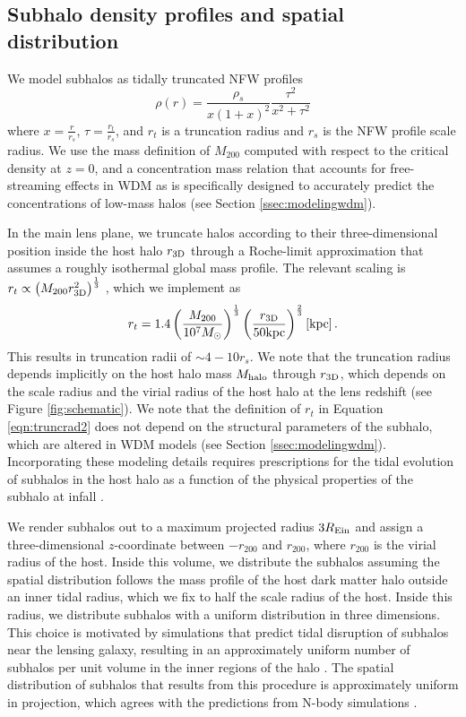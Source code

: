 \subsection{Subhalo density profiles and spatial distribution}
\label{ssec:subhalos}
We model subhalos as tidally truncated NFW profiles \citep{Baltz++09}
\begin{equation}
\label{eqn:massprofile}
\rho \left(r\right) = \frac{\rho_s}{x \left(1+x\right)^2} \frac{\tau^2}{x^2 + \tau^2}
\end{equation}
where $x = \frac{r}{r_s}$, $\tau = \frac{r_t}{r_s}$, and $r_t$ is a truncation radius and $r_s$ is the NFW profile scale radius. We use the mass definition of $M_{200}$ computed with respect to the critical density at $z = 0$, and a concentration mass relation that accounts for free-streaming effects in WDM as is specifically designed to accurately predict the concentrations of low-mass halos (see Section \ref{ssec:modelingwdm}). 

In the main lens plane, we truncate halos according to their three-dimensional position inside the host halo $r_{\rm{3D}}$ through a Roche-limit approximation that assumes a roughly isothermal global mass profile. The relevant scaling is $r_t \propto \left(M_{200} r_{\rm{3D}}^{2}\right)^{\frac{1}{3}}$  \citep{Tormen++98,Cyr-Racine++16}, which we implement as 
\begin{equation} 
\label{eqn:truncrad2}
r_t = 1.4 \left(\frac{M_{200}}{10^7 {M_{\odot}}}\right)^{\frac{1}{3}} \left(\frac{r_{\rm{3D}}}{50 \rm{kpc}}\right)^{\frac{2}{3}} \left[\rm{kpc}\right].
\end{equation}
This results in truncation radii of $\sim 4-10 r_s$. We note that the truncation radius depends implicitly on the host halo mass $M_{\rm{halo}}$ through $r_{\rm{3D}}$, which depends on the scale radius and the virial radius of the host halo at the lens redshift (see Figure \ref{fig:schematic}). We note that the definition of $r_t$ in Equation \ref{eqn:truncrad2} does not depend on the structural parameters of the subhalo, which are altered in WDM models (see Section \ref{ssec:modelingwdm}). Incorporating these modeling details requires prescriptions for the tidal evolution of subhalos in the host halo as a function of the physical properties of the subhalo at infall \citep[e.g.][]{GreenvandenBosch19}.

We render subhalos out to a maximum projected radius $3 R_{\rm{Ein}}$ and assign a three-dimensional $z$-coordinate between $-r_{200}$ and $r_{200}$, where $r_{200}$ is the virial radius of the host. Inside this volume, we distribute the subhalos assuming the spatial distribution follows the mass profile of the host dark matter halo outside an inner tidal radius, which we fix to half the scale radius of the host. Inside this radius, we distribute subhalos with a uniform distribution in three dimensions. This choice is motivated by simulations that predict tidal disruption of subhalos near the lensing galaxy, resulting in an approximately uniform number of subhalos per unit volume in the inner regions of the halo \citep{JiangvdB17}. The spatial distribution of subhalos that results from this procedure is approximately uniform in projection, which agrees with the predictions from N-body simulations \citep{Xu++15}.

